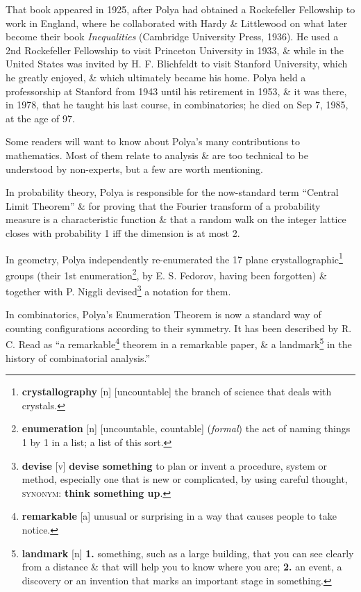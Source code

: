 \documentclass[oneside]{book}
\numberwithin{equation}{section}
\begin{document}
That book appeared in 1925, after Polya had obtained a Rockefeller Fellowship to work in England, where he collaborated with Hardy \& Littlewood on what later become their book \textit{Inequalities} (Cambridge University Press, 1936). He used a 2nd Rockefeller Fellowship to visit Princeton University in 1933, \& while in the United States was invited by H. F. Blichfeldt to visit Stanford University, which he greatly enjoyed, \& which ultimately became his home. Polya held a professorship at Stanford from 1943 until his retirement in 1953, \& it was there, in 1978, that he taught his last course, in combinatorics; he died on Sep 7, 1985, at the age of 97.

Some readers will want to know about Polya's many contributions to mathematics. Most of them relate to analysis \& are too technical to be understood by non-experts, but a few are worth mentioning.

In probability theory, Polya is responsible for the now-standard term ``Central Limit Theorem'' \& for proving that the Fourier transform of a probability measure is a characteristic function \& that a random walk on the integer lattice closes with probability 1 iff the dimension is at most 2.

In geometry, Polya independently re-enumerated the 17 plane crystallographic\footnote{\textbf{crystallography} [n] [uncountable] the branch of science that deals with crystals.} groups (their 1st enumeration\footnote{\textbf{enumeration} [n] [uncountable, countable] (\textit{formal}) the act of naming things 1 by 1 in a list; a list of this sort.}, by E. S. Fedorov, having been forgotten) \& together with P. Niggli devised\footnote{\textbf{devise} [v] \textbf{devise something} to plan or invent a procedure, system or method, especially one that is new or complicated, by using careful thought, \textsc{synonym}: \textbf{think something up}.} a notation for them.

In combinatorics, Polya's Enumeration Theorem is now a standard way of counting configurations according to their symmetry. It has been described by R. C. Read as ``a remarkable\footnote{\textbf{remarkable} [a] unusual or surprising in a way that causes people to take notice.} theorem in a remarkable paper, \& a landmark\footnote{\textbf{landmark} [n] \textbf{1.} something, such as a large building, that you can see clearly from a distance \& that will help you to know where you are; \textbf{2.} an event, a discovery or an invention that marks an important stage in something.} in the history of combinatorial analysis.''
\end{document}
